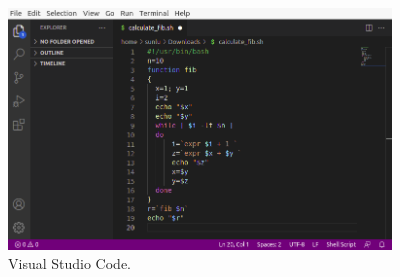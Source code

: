 \begin{figure}[!htb]
	\centering
	\includegraphics[width=4in]{chapters/part-1/figures/vscode_fib.png}
	\caption{Visual Studio Code.}
\end{figure}
